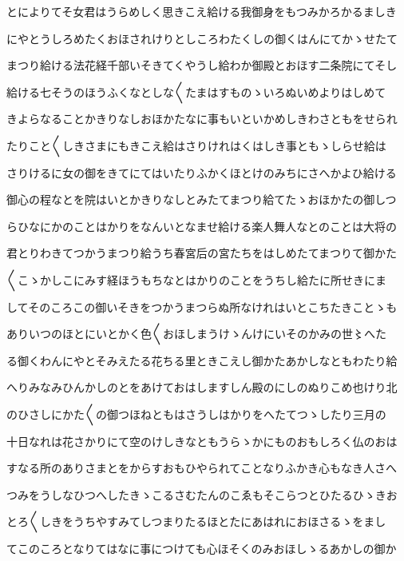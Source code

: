 \documentclass[a4paper,11pt,landscape]{ltjtarticle}
\begin{document}
\par\medskip
とによりてそ女君はうらめしく思きこえ給ける我御身をもつみかろかるましき
\par\medskip
にやとうしろめたくおほされけりとしころわたくしの御くはんにてかゝせたて
\par\medskip
まつり給ける法花経千部いそきてくやうし給わか御殿とおほす二条院にてそし
\par\medskip
給ける七そうのほうふくなとしな〱たまはすものゝいろぬいめよりはしめて
\par\medskip
きよらなることかきりなしおほかたなに事もいといかめしきわさともをせられ
\par\medskip
たりこと〱しきさまにもきこえ給はさりけれはくはしき事ともゝしらせ給は
\par\medskip
さりけるに女の御をきてにてはいたりふかくほとけのみちにさへかよひ給ける
\par\medskip
御心の程なとを院はいとかきりなしとみたてまつり給てたゝおほかたの御しつ
\par\medskip
らひなにかのことはかりをなんいとなませ給ける楽人舞人なとのことは大将の
\par\medskip
君とりわきてつかうまつり給うち春宮后の宮たちをはしめたてまつりて御かた
\par\medskip
〱こゝかしこにみす経ほうもちなとはかりのことをうちし給たに所せきにま
\par\medskip
してそのころこの御いそきをつかうまつらぬ所なけれはいとこちたきことゝも
\par\medskip
ありいつのほとにいとかく色〱おほしまうけゝんけにいそのかみの世〻へた
\par\medskip
る御くわんにやとそみえたる花ちる里ときこえし御かたあかしなともわたり給
\par\medskip
へりみなみひんかしのとをあけておはしますしん殿のにしのぬりこめ也けり北
\par\medskip
のひさしにかた〱の御つほねともはさうしはかりをへたてつゝしたり三月の
\par\medskip
十日なれは花さかりにて空のけしきなともうらゝかにものおもしろく仏のおは
\par\medskip
すなる所のありさまとをからすおもひやられてことなりふかき心もなき人さへ
\par\medskip
つみをうしなひつへしたきゝこるさむたんのこゑもそこらつとひたるひゝきお
\par\medskip
とろ〱しきをうちやすみてしつまりたるほとたにあはれにおほさるゝをまし
\par\medskip
てこのころとなりてはなに事につけても心ほそくのみおほしゝるあかしの御か
\par\medskip
\end{document}
